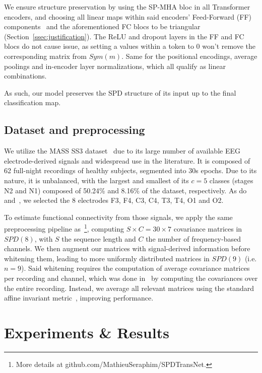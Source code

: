 \documentclass{article}
\makeatletter
\newcommand\footnoteref[1]{\protected@xdef\@thefnmark{\ref{#1}}\@footnotemark}
\makeatother
\begin{document}
We ensure structure preservation by using the SP-MHA bloc in all Transformer encoders, and choosing all linear maps within said encoders' Feed-Forward (FF) components~\cite{transformers} and the aforementioned FC blocs to be triangular (Section~\ref{ssec:justification}).
The ReLU and dropout layers in the FF and FC blocs do not cause issue, as setting a values within a token to 0 won't remove the corresponding matrix from $Sym(m)$.
Same for the positional encodings, average poolings and in-encoder layer normalizations, which all qualify as linear combinations.

As such, our model preserves the SPD structure of its input up to the final classification map.

\subsection{Dataset and preprocessing}
\label{ssec:dataset}

We utilize the MASS SS3 dataset~\cite{o2014montreal} due to its large number of available EEG electrode-derived signals and widespread use in the literature. It is composed of 62 full-night recordings of healthy subjects, segmented into 30s epochs. Due to its nature, it is unbalanced, with the largest and smallest of its $c = 5$ classes (stages N2 and N1) composed of 50.24\% and 8.16\% of the dataset, respectively.
As do~\cite{paul} and~\cite{CAIP_article}, we selected the 8 electrodes F3, F4, C3, C4, T3, T4, O1 and O2.

To estimate functional connectivity from those signals, we apply the same preprocessing pipeline as~\cite{CAIP_article}\footnote{\label{fn:Git}More details at github.com/MathieuSeraphim/SPDTransNet.}, computing $S \times C = 30 \times 7$ covariance matrices in $SPD(8)$, with $S$ the sequence length and $C$ the number of frequency-based channels. We then augment our matrices with signal-derived information before whitening them\footnoteref{fn:Git}, leading to more uniformly distributed matrices in $SPD(9)$ (i.e. $n = 9$).
Said whitening requires the computation of average covariance matrices per recording and channel, which was done in~\cite{CAIP_article} by computing the covariances over the entire recording. Instead, we average all relevant matrices using the standard affine invariant metric~\cite{affine_invariant}, improving performance.

\section{Experiments \& Results}
\label{sec:experiments}
\end{document}
